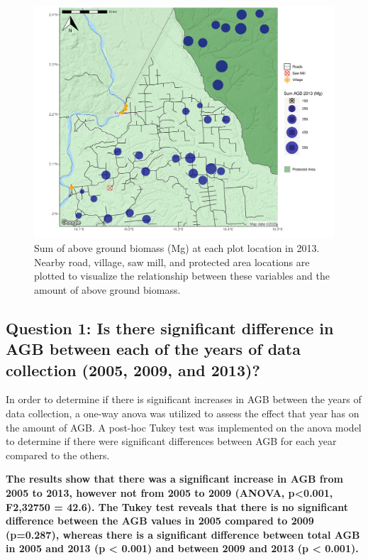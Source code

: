 \documentclass[12pt,]{article}
\begin{document}
\begin{figure}
\centering
\includegraphics{Project_Template_files/figure-latex/mapping2-1.pdf}
\caption{Sum of above ground biomass (Mg) at each plot location in 2013.
Nearby road, village, saw mill, and protected area locations are plotted
to visualize the relationship between these variables and the amount of
above ground biomass.}
\end{figure}

\newpage

\hypertarget{question-1-is-there-significant-difference-in-agb-between-each-of-the-years-of-data-collection-2005-2009-and-2013}{%
\subsection{Question 1: Is there significant difference in AGB between
each of the years of data collection (2005, 2009, and
2013)?}\label{question-1-is-there-significant-difference-in-agb-between-each-of-the-years-of-data-collection-2005-2009-and-2013}}

In order to determine if there is significant increases in AGB between
the years of data collection, a one-way anova was utilized to assess the
effect that year has on the amount of AGB. A post-hoc Tukey test was
implemented on the anova model to determine if there were significant
differences between AGB for each year compared to the others.

\textbf{The results show that there was a significant increase in AGB
from 2005 to 2013, however not from 2005 to 2009 (ANOVA,
p\textless{}0.001, F2,32750 = 42.6). The Tukey test reveals that there
is no significant difference between the AGB values in 2005 compared to
2009 (p=0.287), whereas there is a significant difference between total
AGB in 2005 and 2013 (p \textless{} 0.001) and between 2009 and 2013 (p
\textless{} 0.001).}
\end{document}
